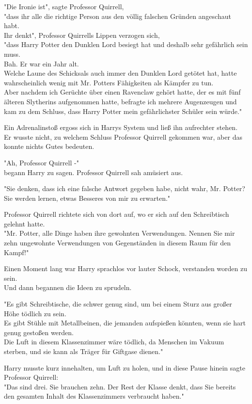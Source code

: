 {"Die Ironie ist", sagte Professor Quirrell,\\ "dass ihr alle die richtige Person aus den völlig falschen Gründen angeschaut habt.\\ Ihr denkt", Professor Quirrells Lippen verzogen sich,\\ "dass Harry Potter den Dunklen Lord besiegt hat und deshalb sehr gefährlich sein muss.\\ Bah. Er war ein Jahr alt.\\ Welche Laune des Schicksals auch immer den Dunklen Lord getötet hat, hatte wahrscheinlich wenig mit Mr. Potters Fähigkeiten als Kämpfer zu tun.\\ Aber nachdem ich Gerüchte über einen Ravenclaw gehört hatte, der es mit fünf älteren Slytherins aufgenommen hatte, befragte ich mehrere Augenzeugen und kam zu dem Schluss, dass Harry Potter mein gefährlichster Schüler sein würde."

Ein Adrenalinstoß ergoss sich in Harrys System und ließ ihn aufrechter stehen.\\ Er wusste nicht, zu welchem Schluss Professor Quirrell gekommen war, aber das konnte nichts Gutes bedeuten.

"Ah, Professor Quirrell -"\\ begann Harry zu sagen. Professor Quirrell sah amüsiert aus.

"Sie denken, dass ich eine falsche Antwort gegeben habe, nicht wahr, Mr. Potter? Sie werden lernen, etwas Besseres von mir zu erwarten."

Professor Quirrell richtete sich von dort auf, wo er sich auf den Schreibtisch gelehnt hatte.\\ "Mr. Potter, alle Dinge haben ihre gewohnten Verwendungen. Nennen Sie mir zehn ungewohnte Verwendungen von Gegenständen in diesem Raum für den Kampf!"

Einen Moment lang war Harry sprachlos vor lauter Schock, verstanden worden zu sein.\\ Und dann begannen die Ideen zu sprudeln.

"Es gibt Schreibtische, die schwer genug sind, um bei einem Sturz aus großer Höhe tödlich zu sein.\\ Es gibt Stühle mit Metallbeinen, die jemanden aufspießen könnten, wenn sie hart genug gestoßen werden.\\ Die Luft in diesem Klassenzimmer wäre tödlich, da Menschen im Vakuum sterben, und sie kann als Träger für Giftgase dienen."

Harry musste kurz innehalten, um Luft zu holen, und in diese Pause hinein sagte Professor Quirrell:\\ "Das sind drei. Sie brauchen zehn. Der Rest der Klasse denkt, dass Sie bereits den gesamten Inhalt des Klassenzimmers verbraucht haben."

}
